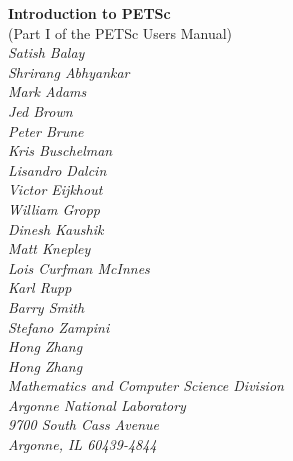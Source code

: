 %
%
%
%


\def\design{\medskip \noindent Design Issue:\begin{em}}
\def\enddesign{\end{em} \medskip}


\def\shortintro{*}
\renewcommand{\cite}[1]{}
\def\thesection {$\!\!\!\!$}

\usepackage{fancyhdr,lastpage}
\pagestyle{fancy}



\begin{center}
$\!$
\vspace{1.0cm}
\thispagestyle{empty}

{\huge \bf Introduction to PETSc}\\
\vspace{0.5cm}
{\LARGE (Part I of the PETSc Users Manual)} \\
\vspace{1.5cm}
{\large \em Satish Balay\\Shrirang Abhyankar\\Mark Adams\\Jed Brown\\Peter Brune\\Kris Buschelman\\Lisandro Dalcin\\Victor Eijkhout\\William Gropp\\Dinesh Kaushik\\Matt Knepley\\Lois Curfman McInnes\\Karl Rupp\\Barry Smith\\Stefano Zampini\\Hong Zhang\\Hong Zhang\\
\medskip \medskip
Mathematics and Computer Science Division\\
Argonne National Laboratory\\
9700 South Cass Avenue\\
Argonne, IL 60439-4844\\
}
\end{center}

